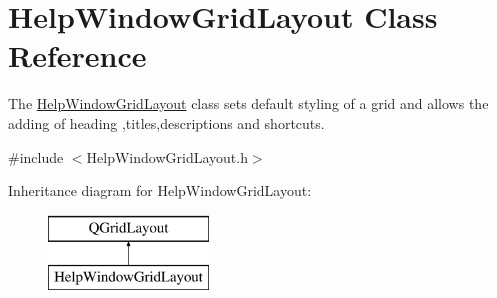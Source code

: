 \hypertarget{class_help_window_grid_layout}{}\section{Help\+Window\+Grid\+Layout Class Reference}
\label{class_help_window_grid_layout}


The \hyperlink{class_help_window_grid_layout}{Help\+Window\+Grid\+Layout} class sets default styling of a grid and allows the adding of heading ,titles,descriptions and shortcuts.  




{\ttfamily \#include $<$Help\+Window\+Grid\+Layout.\+h$>$}

Inheritance diagram for Help\+Window\+Grid\+Layout\+:\begin{figure}[H]
\begin{center}
\leavevmode
\includegraphics[height=2.000000cm]{class_help_window_grid_layout}
\end{center}
\end{figure}
